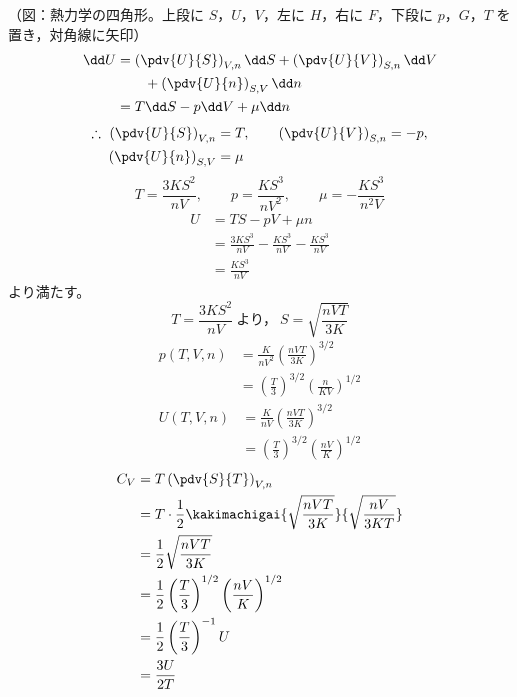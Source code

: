 （図：熱力学の四角形。上段に $S$，$U$，$V$，左に $H$，右に $F$，下段に $p$，$G$，$T$ を置き，対角線に矢印）
\begin{align*}
\dd U&=\left(\pdv{U}{S}\right)_{V,n}\dd S+\left(\pdv{U}{V}\right)_{S,n}\dd V\\
&\qquad+\left(\pdv{U}{n}\right)_{S,V}\dd n\\
&=T\dd S-p\dd V+\mu\dd n
\end{align*}
\begin{align*}
\therefore\ \left(\pdv{U}{S}\right)_{V,n}&=T, \qquad \left(\pdv{U}{V}\right)_{S,n}=-p,\\
\left(\pdv{U}{n}\right)_{S,V}&=\mu
\end{align*}
\[ T=\frac{3KS^{2}}{nV}, \qquad p=\frac{KS^{3}}{nV^{2}}, \qquad \mu=-\frac{KS^{3}}{n^{2}V} \]
\begin{align*}
U&=TS-pV+\mu n\\
&=\frac{3KS^{3}}{nV}-\frac{KS^{3}}{nV}-\frac{KS^{3}}{nV}\\
&=\frac{KS^{3}}{nV}
\end{align*}
より満たす。
\[ T=\frac{3KS^{2}}{nV}\ \text{より，}\ S=\sqrt{\frac{nVT}{3K}} \]
\begin{align*}
p(T,V,n)&=\frac{K}{nV^{2}}\left(\frac{nVT}{3K}\right)^{3/2}\\
&=\left(\frac{T}{3}\right)^{3/2}\left(\frac{n}{KV}\right)^{1/2}
\end{align*}
\begin{align*}
U(T,V,n)&=\frac{K}{nV}\left(\frac{nVT}{3K}\right)^{3/2}\\
&=\left(\frac{T}{3}\right)^{3/2}\left(\frac{nV}{K}\right)^{1/2}
\end{align*}
\begin{align*}
C_{V}&=T\left(\pdv{S}{T}\right)_{V,n}\\
&=T\cdot\frac{1}{2}\kakimachigai{\sqrt{\frac{nVT}{3K}}}{\sqrt{\frac{nV}{3KT}}}\\
&=\frac{1}{2}\sqrt{\frac{nVT}{3K}}\\
&=\frac{1}{2}\left(\frac{T}{3}\right)^{1/2}\left(\frac{nV}{K}\right)^{1/2}\\
&=\frac{1}{2}\left(\frac{T}{3}\right)^{-1}U\\
&=\frac{3U}{2T}
\end{align*}
